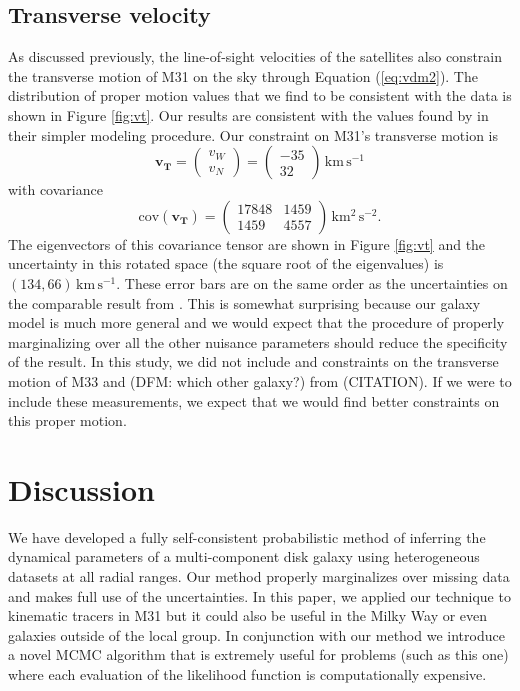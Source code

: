 \documentclass[preprint,12pt]{aastex}
\newcommand{\fig}[1]{Figure \ref{fig:#1}}
\newcommand{\eq}[1]{Equation (\ref{eq:#1})}
\newcommand{\bvec}[1]{\ensuremath{\boldsymbol{#1}}}
\newcommand{\unit}[1]{\,\mathrm{#1}}
\newcommand{\kms}{\unit{km\,s^{-1}}}
\begin{document}
\subsection{Transverse velocity}

As discussed previously, the line-of-sight velocities of the satellites also
constrain the transverse motion of M31 on the sky through \eq{vdm2}. The
distribution of proper motion values that we find to be consistent with the
data is shown in \fig{vt}. Our results are consistent with the values found
by \citet{vdm} in their simpler modeling procedure. Our constraint on
M31's transverse motion is
\begin{equation}
    \bvec{v_T} =
    \left ( \begin{array}{c}
        v_W \\ v_N
    \end{array} \right ) =
    \left ( \begin{array}{c}
        -35 \\ 32
    \end{array} \right ) \kms
\end{equation}
with covariance
\begin{equation}
    \mathrm{cov} (\bvec{v_T}) = \left ( \begin{array}{cc}
        17848 & 1459 \\
        1459  & 4557
    \end{array}\right ) \unit{km^2\, s^{-2}}.
\end{equation}
The eigenvectors of this covariance tensor are shown in \fig{vt} and the
uncertainty in this rotated space (the square root of the eigenvalues) is
$(134, 66) \kms$. These error bars are on the same order as the
uncertainties on the comparable result from \citet{vdm}. This is somewhat
surprising because our galaxy model is much more general and we
would expect that the procedure of properly marginalizing over all the
other nuisance parameters should reduce the specificity of the result.
In this study, we did not include and constraints on the transverse motion
of M33 and (DFM: which other galaxy?) from (CITATION). If we were to include
these measurements, we expect that we would find better constraints on this
proper motion.




\section{Discussion}

We have developed a fully self-consistent probabilistic method of inferring
the dynamical parameters of a multi-component disk galaxy using heterogeneous
datasets at all radial ranges. Our method properly marginalizes over missing
data and makes full use of the uncertainties. In this paper, we applied our
technique to kinematic tracers in M31 but it could also be useful in the
Milky Way or even galaxies outside of the local group. In conjunction with
our method we introduce a novel MCMC algorithm that is extremely useful for
problems (such as this one) where each evaluation of the likelihood function
is computationally expensive.
\end{document}
